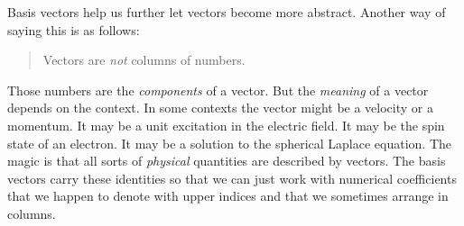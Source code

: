 \documentclass[12pt, oneside]{report}    %
\begin{document}
Basis vectors help us further let vectors become more abstract.
%
Another way of saying this is as follows:
\begin{quote}
Vectors are \emph{not} columns of numbers.
\end{quote}
Those numbers are the \emph{components} of a vector. But the \emph{meaning} of a vector depends on the context. In some contexts the vector might be a velocity or a momentum. It may be a unit excitation in the electric field. It may be the spin state of an electron. It may be a solution to the spherical Laplace equation. The magic is that all sorts of \emph{physical} quantities are described by vectors. The basis vectors carry these identities so that we can just work with numerical coefficients that we happen to denote with upper indices and that we sometimes arrange in columns.
\end{document}
